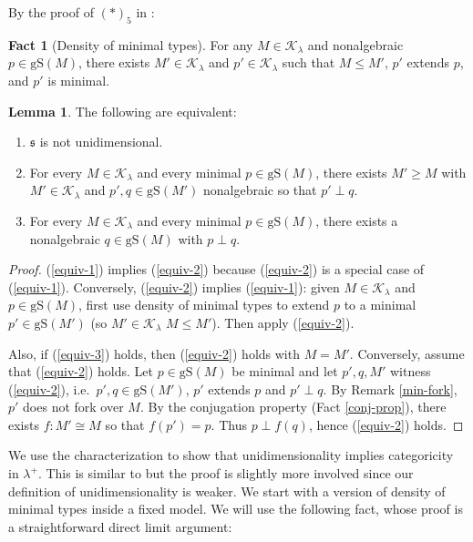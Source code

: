 \documentclass[12pt]{amsart}
\theoremstyle{definition}
\newtheorem{lem}[mydef]{Lemma}
\newtheorem{fact}[mydef]{Fact}
\begin{document}
By the proof of $(\ast)_5$ in \cite[Theorem II.2.7]{sh394}:

\begin{fact}[Density of minimal types]
  For any $M \in {\mathcal{K}}_\lambda$ and nonalgebraic $p \in {\text{gS}} (M)$, there exists $M' \in {\mathcal{K}}_\lambda$ and $p' \in {\mathcal{K}}_\lambda$ such that $M {\le} M'$, $p'$ extends $p$, and $p'$ is minimal.
\end{fact}

\begin{lem}\label{technical-multidim-equiv}
  The following are equivalent:

  \begin{enumerate}
    \item\label{equiv-1} ${\mathfrak{s}}$ is not unidimensional.
    \item\label{equiv-2} For every $M \in {\mathcal{K}}_{\lambda}$ and every minimal $p \in {\text{gS}} (M)$, there exists $M' {\ge} M$ with $M' \in {\mathcal{K}}_{\lambda}$ and $p', q \in {\text{gS}} (M')$ nonalgebraic so that $p' \perp q$.
    \item\label{equiv-3} For every $M \in {\mathcal{K}}_{\lambda}$ and every minimal $p \in {\text{gS}} (M)$, there exists a nonalgebraic $q \in {\text{gS}} (M)$ with $p \perp q$.
  \end{enumerate}
\end{lem}
\begin{proof}
  (\ref{equiv-1}) implies (\ref{equiv-2}) because (\ref{equiv-2}) is a special case of (\ref{equiv-1}). Conversely, (\ref{equiv-2}) implies (\ref{equiv-1}): given $M \in {\mathcal{K}}_\lambda$ and $p \in {\text{gS}} (M)$, first use density of minimal types to extend $p$ to a minimal $p' \in {\text{gS}} (M')$ (so $M' \in {\mathcal{K}}_\lambda$ $M {\le} M'$). Then apply (\ref{equiv-2}).

  Also, if (\ref{equiv-3}) holds, then (\ref{equiv-2}) holds with $M = M'$. Conversely, assume that (\ref{equiv-2}) holds. Let $p \in {\text{gS}} (M)$ be minimal and let $p', q, M'$ witness (\ref{equiv-2}), i.e.\ $p', q \in {\text{gS}} (M')$, $p'$ extends $p$ and $p' \perp q$. By Remark \ref{min-fork}, $p'$ does not fork over $M$. By the conjugation property (Fact \ref{conj-prop}), there exists $f: M' \cong M$ so that $f (p') = p$. Thus $p \perp f (q)$, hence (\ref{equiv-2}) holds.
\end{proof}

We use the characterization to show that unidimensionality implies categoricity in $\lambda^+$. This is similar to \cite[Proposition 4.25]{makkaishelah} but the proof is slightly more involved since our definition of unidimensionality is weaker. We start with a version of density of minimal types inside a fixed model. We will use the following fact, whose proof is a straightforward direct limit argument: 
\end{document}
